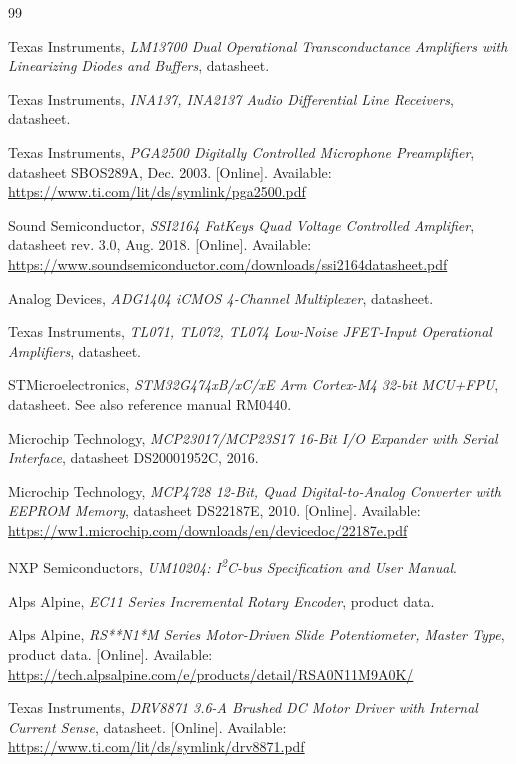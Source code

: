 \documentclass[11pt, letterpaper,titlepage]{article}
\begin{document}
\begin{thebibliography}{99}

Texas Instruments, \emph{LM13700 Dual Operational Transconductance Amplifiers
with Linearizing Diodes and Buffers}, datasheet.

Texas Instruments, \emph{INA137, INA2137 Audio Differential Line Receivers},
datasheet.

Texas Instruments, \emph{PGA2500 Digitally Controlled Microphone Preamplifier},
datasheet SBOS289A, Dec. 2003. [Online]. Available:
\url{https://www.ti.com/lit/ds/symlink/pga2500.pdf}

Sound Semiconductor, \emph{SSI2164 FatKeys Quad Voltage Controlled Amplifier},
datasheet rev. 3.0, Aug. 2018. [Online]. Available:
\url{https://www.soundsemiconductor.com/downloads/ssi2164datasheet.pdf}

Analog Devices, \emph{ADG1404 iCMOS 4-Channel Multiplexer}, datasheet.

Texas Instruments, \emph{TL071, TL072, TL074 Low-Noise JFET-Input Operational
Amplifiers}, datasheet.

STMicroelectronics, \emph{STM32G474xB/xC/xE Arm Cortex-M4 32-bit MCU+FPU},
datasheet. See also reference manual RM0440.

Microchip Technology, \emph{MCP23017/MCP23S17 16-Bit I/O Expander with Serial
Interface}, datasheet DS20001952C, 2016.

Microchip Technology, \emph{MCP4728 12-Bit, Quad Digital-to-Analog Converter
with EEPROM Memory}, datasheet DS22187E, 2010. [Online]. Available:
\url{https://ww1.microchip.com/downloads/en/devicedoc/22187e.pdf}

NXP Semiconductors, \emph{UM10204: I\textsuperscript{2}C-bus Specification and
User Manual}.

Alps Alpine, \emph{EC11 Series Incremental Rotary Encoder}, product data.

Alps Alpine, \emph{RS**N1*M Series Motor-Driven Slide Potentiometer, Master
Type}, product data. [Online]. Available:
\url{https://tech.alpsalpine.com/e/products/detail/RSA0N11M9A0K/}

Texas Instruments, \emph{DRV8871 3.6-A Brushed DC Motor Driver with Internal
Current Sense}, datasheet. [Online]. Available:
\url{https://www.ti.com/lit/ds/symlink/drv8871.pdf}


\end{thebibliography}
\end{document}
